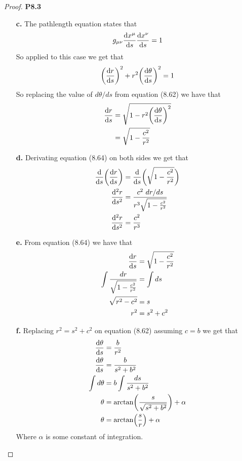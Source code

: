 \documentclass[11pt]{article}
\theoremstyle{definition}
\begin{document}
\begin{proof}{\textbf{P8.3}}
\begin{itemize}
        \item [\textbf{c.}] The pathlength equation states that
        \begin{align*}
            g_{\mu\nu}\derivative{x^\mu}{s}\derivative{x^\nu}{s} = 1
        \end{align*}
        So applied to this case we get that
        \begin{align*}
            \bigg(\derivative{r}{s}\bigg)^2
            + r^2\bigg(\derivative{\theta}{s}\bigg)^2 = 1
        \end{align*}
        So replacing the value of $d\theta/ds$ from equation (8.62) we have that
        \begin{align*}
            \derivative{r}{s}
            &= \sqrt{1 - r^2\bigg(\derivative{\theta}{s}\bigg)^2}\\
            &= \sqrt{1 - \frac{c^2}{r^2}}
        \end{align*}

        \item [\textbf{d.}] Derivating equation (8.64) on both sides we get that
        \begin{align*}
            \derivative{}{s}\bigg(\derivative{r}{s}\bigg)
            &= \derivative{}{s}\bigg(\sqrt{1 - \frac{c^2}{r^2}}\bigg)\\
            \derivative[2]{r}{s}
            &= \frac{c^2~dr/ds}{r^3\sqrt{1 - \frac{c^2}{r^2}}}\\
            \derivative[2]{r}{s} &= \frac{c^2}{r^3}
        \end{align*}

        \item [\textbf{e.}] From equation (8.64) we have that 
        \begin{align*}
            \derivative{r}{s} &= \sqrt{1 - \frac{c^2}{r^2}}\\
            \int \frac{dr}{\sqrt{1 - \frac{c^2}{r^2}}} &= \int ds\\
            \sqrt{r^2 - c^2} &= s\\
            r^2 &= s^2 + c^2
        \end{align*}

        \item [\textbf{f.}] Replacing $r^2 = s^2 + c^2$ on equation (8.62)
        assuming $c = b$ we get that
        \begin{align*}
            \derivative{\theta}{s} &= \frac{b}{r^2}\\
            \derivative{\theta}{s} &= \frac{b}{s^2 + b^2}\\
            \int d\theta &= b\int \frac{ds}{s^2 + b^2}\\
            \theta &= \arctan(\frac{s}{\sqrt{s^2 + b^2}}) + \alpha\\
            \theta &= \arctan(\frac{s}{r}) + \alpha
        \end{align*}
        Where $\alpha$ is some constant of integration.
    \end{itemize}
\end{proof}
\end{document}
